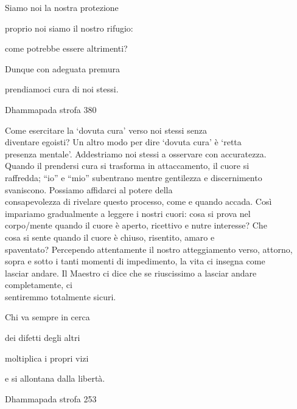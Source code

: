 \documentclass[a4paper,portrait,12pt]{article}
\begin{document}
Siamo noi la nostra protezione


proprio noi siamo il nostro rifugio: 


come potrebbe essere altrimenti?


Dunque con adeguata premura


prendiamoci cura di noi stessi.





Dhammapada strofa 380


\newpage



Come esercitare la `dovuta cura' verso noi stessi senza\\diventare egoisti? Un altro modo per dire `dovuta cura' \`{e} `retta\\presenza mentale'. Addestriamo noi stessi a osservare con accuratezza.\\Quando il prendersi cura si trasforma in attaccamento, il cuore si\\raffredda; ``io'' e ``mio'' subentrano mentre gentilezza e discernimento\\svaniscono. Possiamo affidarci al potere della\\consapevolezza di rivelare questo processo, come e quando accada. Così\\impariamo gradualmente a leggere i nostri cuori: cosa si prova nel\\corpo/mente quando il cuore \`{e} aperto, ricettivo e nutre interesse? Che\\cosa si sente quando il cuore \`{e} chiuso, risentito, amaro e\\spaventato? Percependo attentamente il nostro atteggiamento verso, attorno,\\sopra e sotto i tanti momenti di impedimento, la vita ci insegna come\\lasciar andare. Il Maestro ci dice che se riuscissimo a lasciar andare completamente, ci\\sentiremmo totalmente sicuri.


\newpage



Chi va sempre in cerca


dei difetti degli altri


moltiplica i propri vizi 


e si allontana dalla libert\`{a}.





Dhammapada strofa 253
\end{document}
